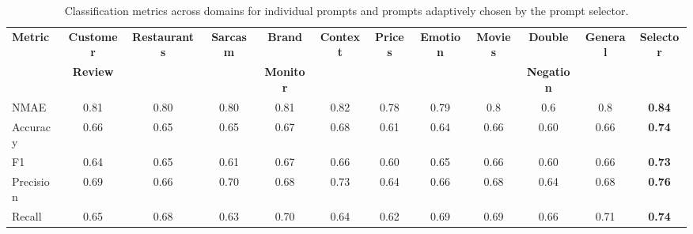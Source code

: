 \begin{table*}[ht]
\centering
\caption{Classification metrics across domains for individual prompts and prompts adaptively chosen by the prompt selector. }
\vspace{2pt}
\begin{adjustbox}{width=\textwidth}
\begin{tabular}{lcccccccccc|c}
\toprule
\textbf{Metric} & \textbf{Customer} & \textbf{Restaurants} & \textbf{Sarcasm} & \textbf{Brand} & \textbf{Context} & \textbf{Prices} & \textbf{Emotion} & \textbf{Movies} & \textbf{Double} & \textbf{General} & \textbf{Selector} \\
& \textbf{Review} & & & \textbf{Monitor} & & & & & \textbf{Negation} & \\
\midrule
NMAE & 0.81 & 0.80 & 0.80 & 0.81 & 0.82 & 0.78 & 0.79 & 0.8 & 0.6 & 0.8 & \textbf{0.84} \\
Accuracy   & 0.66 & 0.65 & 0.65 & 0.67 & 0.68 & 0.61 & 0.64 & 0.66 & 0.60 & 0.66 & \textbf{0.74} \\
F1         & 0.64 & 0.65 & 0.61 & 0.67 & 0.66 & 0.60 & 0.65 & 0.66 & 0.60 & 0.66 & \textbf{0.73} \\
Precision  & 0.69 & 0.66 & 0.70 & 0.68 & 0.73 & 0.64 & 0.66 & 0.68 & 0.64 & 0.68 & \textbf{0.76} \\
Recall     & 0.65 & 0.68 & 0.63 & 0.70 & 0.64 & 0.62 & 0.69 & 0.69 & 0.66 & 0.71 & \textbf{0.74} \\
\bottomrule
\end{tabular}
\end{adjustbox}
\label{table:selector}
\end{table*}
